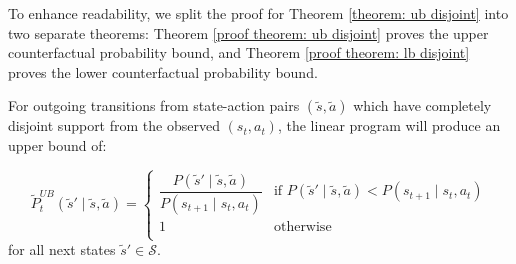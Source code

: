 To enhance readability, we split the proof for Theorem \ref{theorem: ub disjoint} into two separate theorems: Theorem \ref{proof theorem: ub disjoint} proves the upper counterfactual probability bound, and Theorem \ref{proof theorem: lb disjoint} proves the lower counterfactual probability bound.

\begin{theorem}
\label{proof theorem: ub disjoint}
For outgoing transitions from state-action pairs $(\tilde{s}, \tilde{a})$ which have completely disjoint support from the observed $(s_t, a_t)$, the linear program will produce an upper bound of:

\[\tilde{P}_{t}^{UB}(\tilde{s}' \mid \tilde{s}, \tilde{a}) = 
\begin{cases}
\dfrac{P(\tilde{s}' \mid \tilde{s}, \tilde{a})}{P(s_{t+1} \mid s_t, a_t)} & \text{if $P(\tilde{s}' \mid \tilde{s}, \tilde{a}) < P(s_{t+1} \mid s_t, a_t)$} \\
1 & \text{otherwise} \\
\end{cases}
\]
for all next states $\tilde{s}' \in \mathcal{S}$.

\end{theorem}

